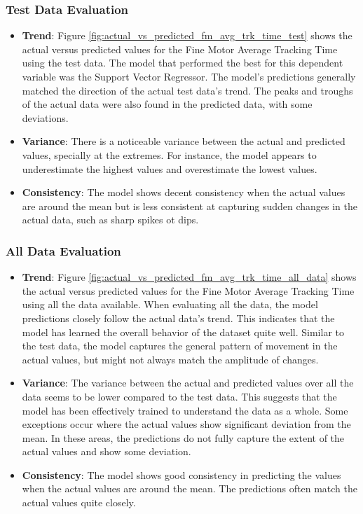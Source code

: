 \subsubsection*{Test Data Evaluation}

\begin{itemize}
    \item \textbf{Trend}: Figure \ref{fig:actual_vs_predicted_fm_avg_trk_time_test} shows the actual versus predicted values for the Fine Motor Average Tracking Time using the test data. The model that performed
          the best for this dependent variable was the Support Vector Regressor. The model's predictions generally matched the direction of the actual test data's trend. The peaks and troughs of the
          actual data were also found in the predicted data, with some deviations.
    \item \textbf{Variance}: There is a noticeable variance between the actual and predicted values, specially at the extremes. For instance, the model appears to underestimate the highest values
          and overestimate the lowest values.
    \item \textbf{Consistency}: The model shows decent consistency when the actual values are around the mean but is less consistent at capturing sudden changes in the actual data, such as sharp spikes ot dips.
\end{itemize}

\subsubsection*{All Data Evaluation}

\begin{itemize}
    \item \textbf{Trend}: Figure \ref{fig:actual_vs_predicted_fm_avg_trk_time_all_data} shows the actual versus predicted values for the Fine Motor Average Tracking Time using all the data
          available. When evaluating all the data, the model predictions closely follow the actual data's trend. This indicates that the model has learned the overall behavior of the dataset quite well.
          Similar to the test data, the model captures the general pattern of movement in the actual values, but might not always match the amplitude of changes.
    \item \textbf{Variance}: The variance between the actual and predicted values over all the data seems to be lower compared to the test data. This suggests that the model has been
          effectively trained to understand the data as a whole. Some exceptions occur where the actual values show significant deviation from the mean. In these areas, the predictions do not fully
          capture the extent of the actual values and show some deviation.
    \item \textbf{Consistency}: The model shows good consistency in predicting the values when the actual values are around the mean. The predictions often match the actual values quite closely.
\end{itemize}

